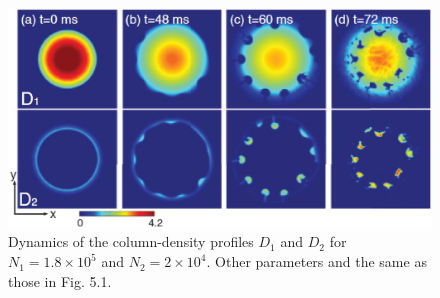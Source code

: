 \documentclass[12pt,a4paper]{report}
\begin{document}
\begin{figure}[htbp]
\begin{center}
\includegraphics[scale=0.5,keepaspectratio]{5-2.eps}
\caption{
Dynamics of the column-density profiles
$D_1$ and $D_2$ for $N_1 = 1.8 \times 10^5$ and $N_2 = 2 \times 10^4$. Other parameters
and the same as those in Fig. 5.1.
}
\label{FIG:5-2}
\end{center}
\end{figure}
\end{document}
